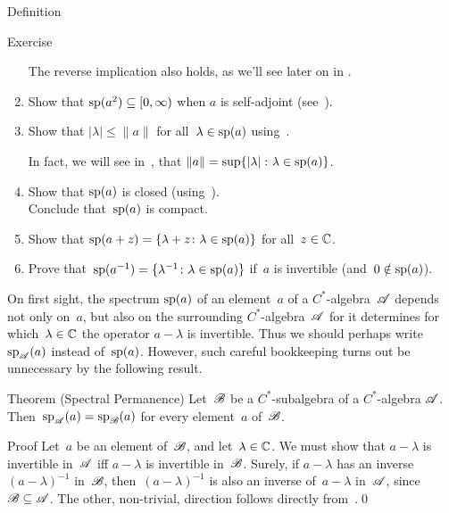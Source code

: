 \documentclass[a]{subfiles}
\begin{document}
\begin{parsec}
\begin{point}{Definition}
\begin{point}{Exercise}
\begin{enumerate}
The reverse implication also holds,
as we'll see later on in \TODO{}.
\item
Show that $\mathrm{sp}(a^2)\subseteq [0,\infty)$ when $a$ is self-adjoint
(see~).

\item
Show that $|\lambda|\leq \|a\|$ for all~$\lambda\in\mathrm{sp}(a)$
using~.

In fact, we will see in~,
that $\|a\|=\sup\{\left|\lambda\right|\colon \lambda\in \mathrm{sp}(a)\}$.
\item
Show that $\mathrm{sp}(a)$ is closed (using~).\\
Conclude that~$\mathrm{sp}(a)$ is compact.
\item
Show that $\mathrm{sp}(a+z)=\{\lambda+z\colon \lambda\in\mathrm{sp}(a)\}$
for all~$z\in \mathbb{C}$.
\item
Prove that~$\mathrm{sp}(a^{-1})=\{\lambda^{-1}\colon \lambda\in \mathrm{sp}(a)\}$
if~$a$ is invertible (and~$0\notin \mathrm{sp}(a)$).
\end{enumerate}
\end{point}
\end{point}
\begin{point}%
On first sight,
the spectrum $\mathrm{sp}(a)$
of an element~$a$ of a $C^*$-algebra~$\mathscr{A}$ 
depends not only on~$a$,
but also on the surrounding $C^*$-algebra~$\mathscr{A}$ for it determines
for which~$\lambda\in\mathbb{C}$ the operator $a-\lambda$ is invertible.
Thus we should perhaps write $\mathrm{sp}_{\mathscr{A}}(a)$ instead
of~$\mathrm{sp}(a)$.
However, such careful bookkeeping turns out 
be unnecessary
by the following result.
\end{point}
\begin{point}{Theorem (Spectral Permanence)}%
Let~$\mathscr{B}$ be a $C^*$-subalgebra of a $C^*$-algebra $\mathscr{A}$.
Then~$\mathrm{sp}_{\mathscr{A}}(a)=\mathrm{sp}_{\mathscr{B}}(a)$
for every element~$a$ of~$\mathscr{B}$.
\begin{point}{Proof}%
Let~$a$ be an element of~$\mathscr{B}$,
and let~$\lambda\in \mathbb{C}$.
We must show that $a-\lambda$ is invertible in~$\mathscr{A}$
iff $a-\lambda$ is invertible in~$\mathscr{B}$.
Surely,
if $a-\lambda$ has an inverse $(a-\lambda)^{-1}$ in~$\mathscr{B}$,
then~$(a-\lambda)^{-1}$ is also an inverse of~$a-\lambda$ in~$\mathscr{A}$,
since~$\mathscr{B}\subseteq \mathscr{A}$.
The other, non-trivial, direction follows
directly from~.\qed%
\end{point}
\end{point}
\end{parsec}
\end{document}
